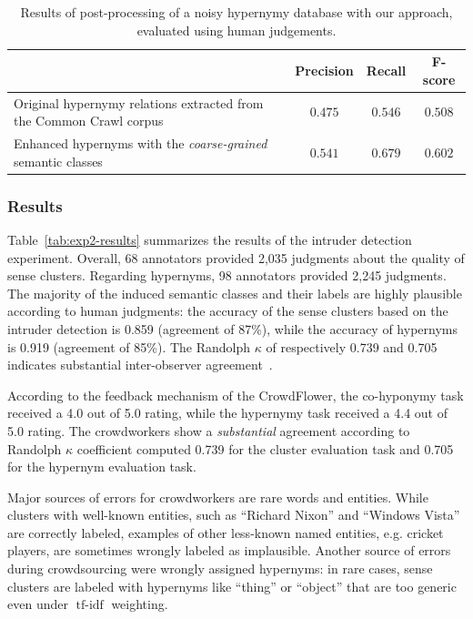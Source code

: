 \documentclass[10pt, a4paper]{article}
\DeclareMathOperator{\tfidf}{tf-idf}
\begin{document}
\begin{table}
\footnotesize
\centering

\begin{tabular}{l|c|c|c}
 & \textbf{Precision} & \textbf{Recall} & \textbf{F-score} \\ \toprule
Original hypernymy relations extracted from the Common Crawl corpus~\cite{seitner2016large} & $0.475$ & $0.546$ & $0.508$ \\
Enhanced hypernyms with the \textit{coarse-grained} semantic classes   & $\mathbf{0.541}$ & $\mathbf{0.679}$ & $\mathbf{0.602}$ \\
\end{tabular}

\caption{Results of post-processing of a noisy hypernymy database with our approach, evaluated using human judgements.}
\label{tab:exp3-results}
\end{table}


\subsubsection{Results}


Table~\ref{tab:exp2-results} summarizes the results of the intruder detection experiment. Overall, 68 annotators provided 2,035 judgments about the quality of sense clusters. Regarding hypernyms, 98 annotators provided 2,245 judgments. The majority of the induced semantic classes and their labels are highly plausible according to human judgments: the accuracy of the sense clusters based on the intruder detection is 0.859 (agreement of 87\%), while the accuracy of hypernyms is 0.919 (agreement of 85\%). The Randolph $\kappa$ of respectively 0.739 and 0.705 indicates substantial inter-observer agreement~\cite{randolph2005free}. 

According to the feedback mechanism of the CrowdFlower, the co-hyponymy task received a 4.0 out of 5.0 rating, while the hypernymy task received a 4.4 out of 5.0 rating. The crowdworkers show a \textit{substantial} agreement according to Randolph $\kappa$ coefficient computed 0.739 for the cluster evaluation task and 0.705 for the hypernym evaluation task.

Major sources of errors for crowdworkers are rare words and entities. While clusters with well-known entities, such as ``Richard Nixon'' and ``Windows Vista'' are correctly labeled, examples of other less-known named entities, e.g. cricket players, are sometimes wrongly labeled as implausible. Another source of errors during crowdsourcing were wrongly assigned hypernyms: in rare cases, sense clusters are labeled with hypernyms like ``thing'' or ``object'' that are too generic even under  $\tfidf$ weighting. 
\end{document}
